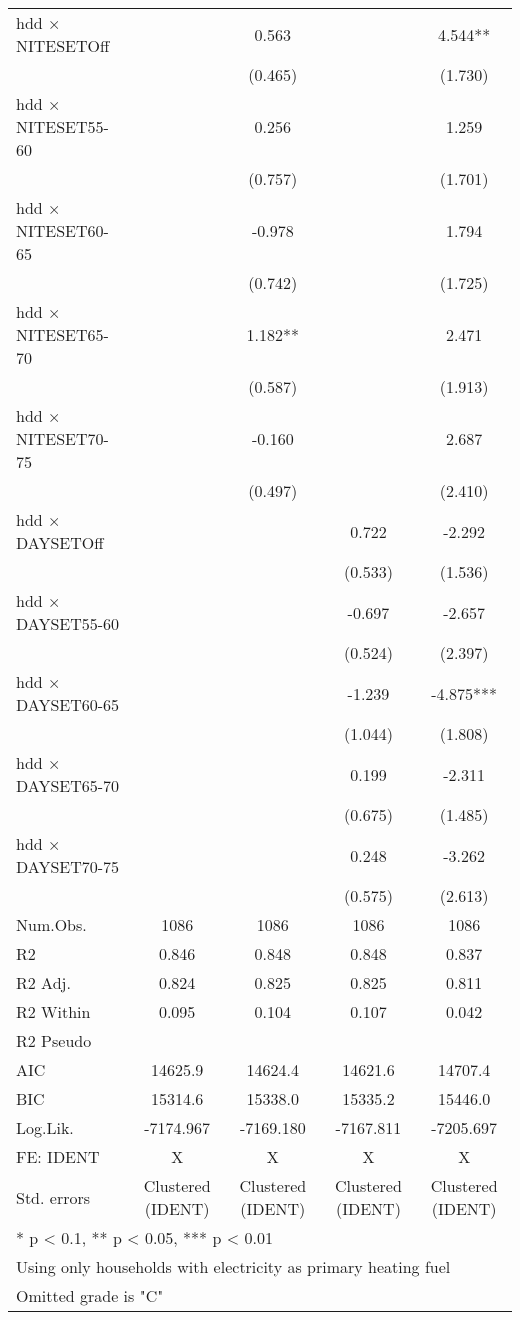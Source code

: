 \documentclass[
]{article}
\begin{document}
\begin{table}
{\begin{tabular}[t]{lcccc}
hdd × NITESETOff &  & 0.563 &  & 4.544**\\
 &  & (0.465) &  & (1.730)\\
hdd × NITESET55-60 &  & 0.256 &  & 1.259\\
 &  & (0.757) &  & (1.701)\\
hdd × NITESET60-65 &  & -0.978 &  & 1.794\\
 &  & (0.742) &  & (1.725)\\
hdd × NITESET65-70 &  & 1.182** &  & 2.471\\
 &  & (0.587) &  & (1.913)\\
hdd × NITESET70-75 &  & -0.160 &  & 2.687\\
 &  & (0.497) &  & (2.410)\\
hdd × DAYSETOff &  &  & 0.722 & -2.292\\
 &  &  & (0.533) & (1.536)\\
hdd × DAYSET55-60 &  &  & -0.697 & -2.657\\
 &  &  & (0.524) & (2.397)\\
hdd × DAYSET60-65 &  &  & -1.239 & -4.875***\\
 &  &  & (1.044) & (1.808)\\
hdd × DAYSET65-70 &  &  & 0.199 & -2.311\\
 &  &  & (0.675) & (1.485)\\
hdd × DAYSET70-75 &  &  & 0.248 & -3.262\\
 &  &  & (0.575) & (2.613)\\
\midrule
Num.Obs. & 1086 & 1086 & 1086 & 1086\\
R2 & 0.846 & 0.848 & 0.848 & 0.837\\
R2 Adj. & 0.824 & 0.825 & 0.825 & 0.811\\
R2 Within & 0.095 & 0.104 & 0.107 & 0.042\\
R2 Pseudo &  &  &  & \\
AIC & 14625.9 & 14624.4 & 14621.6 & 14707.4\\
BIC & 15314.6 & 15338.0 & 15335.2 & 15446.0\\
Log.Lik. & -7174.967 & -7169.180 & -7167.811 & -7205.697\\
FE: IDENT & X & X & X & X\\
Std. errors & Clustered (IDENT) & Clustered (IDENT) & Clustered (IDENT) & Clustered (IDENT)\\
\bottomrule
\multicolumn{5}{l}{\textsuperscript{} * p < 0.1, ** p < 0.05, *** p < 0.01}\\
\multicolumn{5}{l}{\textsuperscript{} Using only households with electricity as primary heating fuel}\\
\multicolumn{5}{l}{\textsuperscript{} Omitted grade is "C"}\\
\end{tabular}}
\end{table}
\end{document}
